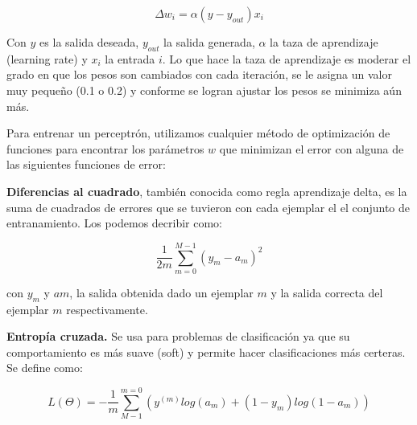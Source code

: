 \begin{equation}
 \Delta w_{i} = \alpha(y - y_{out})x_{i}
\end{equation}

 
Con $y$ es la salida deseada, $y_{out}$ la salida generada, $\alpha$ la taza de aprendizaje (learning rate) y $x_{i}$ la entrada $i$. Lo que hace la taza de aprendizaje es moderar el grado en que los pesos son cambiados con cada iteración, se le asigna un valor muy pequeño (0.1 o 0.2) y conforme se logran ajustar los pesos se minimiza aún más. 




Para entrenar un perceptrón, utilizamos cualquier método de optimización de funciones para encontrar los parámetros $w$ que minimizan el error con alguna de las siguientes funciones de error:

\begin{description}
   
 \item \textbf{Diferencias al cuadrado}, también conocida como regla aprendizaje delta, es la suma de cuadrados de errores que se tuvieron con cada ejemplar el el conjunto de entranamiento. Los podemos decribir como: 
 
 \begin{equation}
   \dfrac{1}{2m}\sum_{m=0}^{M-1} (y_{m} - a_{m})^2
 \end{equation}
 
 con $y_{m}$ y $a{m}$, la salida obtenida dado un ejemplar $m$ y la salida correcta del ejemplar $m$ respectivamente.
 
 \item \textbf{Entropía cruzada.} Se usa para problemas de clasificación ya que su comportamiento es más suave (soft) y permite hacer clasificaciones más certeras. Se define como:

 \begin{equation}
  L (\Theta) = -\dfrac{1}{m}\sum_{M-1}^{m=0}(y^(m)log(a_{m}) + (1-y_{m}) log(1-a_{m})) 
 \end{equation}

\end{description}

